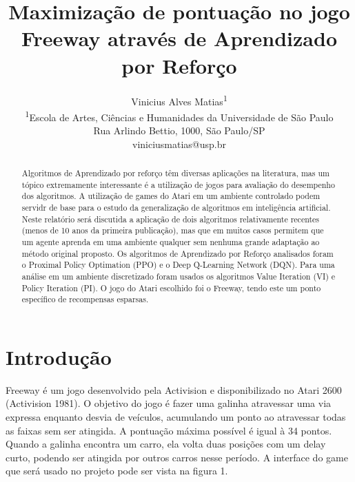 \documentclass[letterpaper]{article} %
\title{Maximização de pontuação no jogo Freeway através de Aprendizado por Reforço}
\author{Vinicius Alves Matias\textsuperscript{\rm 1} \\ 
\textsuperscript{\rm 1}Escola de Artes, Ciências e Humanidades da Universidade de São Paulo\\ %
Rua Arlindo Bettio, 1000, São Paulo/SP\\
viniciusmatias@usp.br %
}
\begin{document}
\maketitle

\begin{abstract}
Algoritmos de Aprendizado por reforço têm diversas aplicações na literatura, mas um tópico extremamente interessante é a utilização de jogos para avaliação do desempenho dos algoritmos. A utilização de games do  Atari em um ambiente controlado podem servidr de base para o estudo da generalização de algoritmos em inteligência artificial. Neste relatório será discutida a aplicação de dois algoritmos relativamente recentes (menos de 10 anos da primeira publicação), mas que em muitos casos permitem que um agente aprenda em uma ambiente qualquer sem nenhuma grande adaptação ao método original proposto. Os algoritmos de Aprendizado por Reforço analisados foram o Proximal Policy Optimation (PPO) e o Deep Q-Learning Network (DQN). Para uma análise em um ambiente discretizado foram usados os algoritmos Value Iteration (VI) e Policy Iteration (PI). O jogo do Atari escolhido foi o Freeway, tendo este um ponto específico de recompensas esparsas. 
\end{abstract}

\section{Introdução}
Freeway é um jogo desenvolvido pela Activision e disponibilizado no Atari 2600 (Activision 1981). O objetivo do jogo é fazer uma galinha atravessar uma via expressa enquanto desvia de veículos, acumulando um ponto ao atravessar todas as faixas sem ser atingida. A pontuação máxima possível é igual à 34 pontos. Quando a galinha encontra um carro, ela volta duas posições com um delay curto, podendo ser atingida por outros carros nesse período. A interface do game que será usado no projeto pode ser vista na figura 1.
\end{document}
